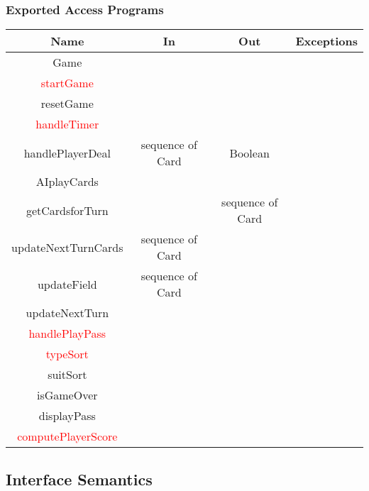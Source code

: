 \documentclass[12pt, titlepage]{article}
\begin{document}
\subsubsection{Exported Access Programs}
\begin{tabular}[pos]{|c|c|c|c|}
\hline
\textbf{Name}& \textbf{In} & \textbf{Out} & \textbf{Exceptions} \\ \hline
Game & ~ & ~ & ~ \\ \hline
\textcolor{red}{startGame}  & ~ & ~ & ~ \\ \hline
resetGame & ~ & ~ & ~ \\ \hline
\textcolor{red}{handleTimer} & ~ & ~ & ~ \\ \hline
handlePlayerDeal & sequence of Card & Boolean & ~ \\ \hline
AIplayCards & ~ & ~ & ~ \\ \hline
getCardsforTurn & ~ & sequence of Card & ~ \\ \hline
updateNextTurnCards & sequence of Card & ~ & ~ \\ \hline
updateField & sequence of Card & ~ & ~ \\ \hline
updateNextTurn & ~ & ~ & ~ \\ \hline
\textcolor{red}{handlePlayPass} & ~ & ~ & ~ \\ \hline
\textcolor{red}{typeSort} & ~ & ~ & ~ \\ \hline
suitSort & ~ & ~ & ~ \\ \hline
isGameOver & ~ & ~ & ~ \\ \hline
displayPass & ~ & ~ & ~ \\ \hline
\textcolor{red}{computePlayerScore} & ~ & ~ & ~ \\ \hline
\end{tabular}
\subsection{Interface Semantics}
\end{document}
